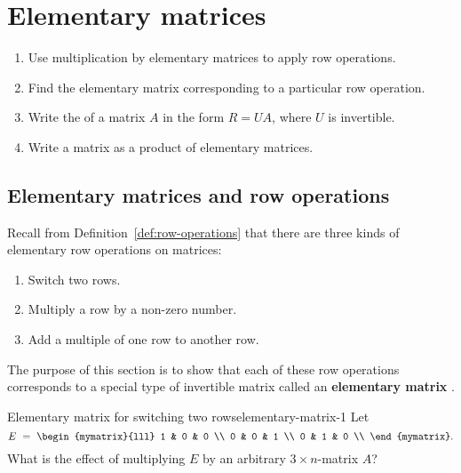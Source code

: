 \section{Elementary matrices}
\label{sec:elementary-matrices}

\begin{outcome}
  \begin{enumerate}
  \item Use multiplication by elementary matrices to apply row
    operations.
  \item Find the elementary matrix corresponding to a particular row
    operation.
  \item Write the {\rref} of a matrix $A$ in the form $R=UA$, where
    $U$ is invertible.
  \item Write a matrix as a product of elementary matrices.
  \end{enumerate}
\end{outcome}

\subsection{Elementary matrices and row operations}

Recall from Definition~\ref{def:row-operations} that there are three
kinds of elementary row operations%
%
%
%
 on matrices:
\begin{enumerate}
\item Switch two rows.
\item Multiply a row by a non-zero number.
\item Add a multiple of one row to another row.
\end{enumerate}
The purpose of this section is to show that each of these row
operations corresponds to a special type of invertible matrix called
an \textbf{elementary matrix}%
.

\begin{example}{Elementary matrix for switching two rows}{elementary-matrix-1}
  Let
  \begin{equation*}
    E ~=~ \begin{mymatrix}{lll}
      1 & 0 & 0 \\
      0 & 0 & 1 \\
      0 & 1 & 0 \\
    \end{mymatrix}.
  \end{equation*}
  What is the effect of multiplying $E$ by an arbitrary $3\times
  n$-matrix $A$?
\end{example}

